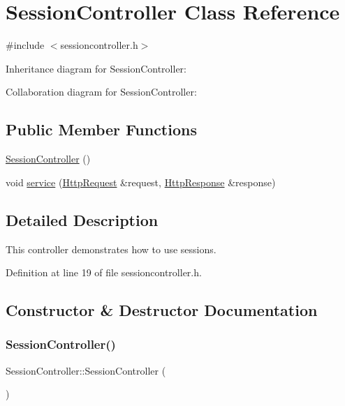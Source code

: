 \hypertarget{class_session_controller}{}\section{Session\+Controller Class Reference}
\label{class_session_controller}


{\ttfamily \#include $<$sessioncontroller.\+h$>$}



Inheritance diagram for Session\+Controller\+:


Collaboration diagram for Session\+Controller\+:
\subsection*{Public Member Functions}
\begin{DoxyCompactItemize}
\item 
\mbox{\hyperlink{class_session_controller_a7838781fcb65269c006c2409bb396578}{Session\+Controller}} ()
\item 
void \mbox{\hyperlink{class_session_controller_a2eb65af29d53ff51d709cc892611d5a9}{service}} (\mbox{\hyperlink{classstefanfrings_1_1_http_request}{Http\+Request}} \&request, \mbox{\hyperlink{classstefanfrings_1_1_http_response}{Http\+Response}} \&response)
\end{DoxyCompactItemize}


\subsection{Detailed Description}
This controller demonstrates how to use sessions. 

Definition at line 19 of file sessioncontroller.\+h.



\subsection{Constructor \& Destructor Documentation}
\mbox{\label{class_session_controller_a7838781fcb65269c006c2409bb396578}} 
\subsubsection{\texorpdfstring{Session\+Controller()}{SessionController()}}
{\footnotesize\ttfamily Session\+Controller\+::\+Session\+Controller (\begin{DoxyParamCaption}{ }\end{DoxyParamCaption})}

